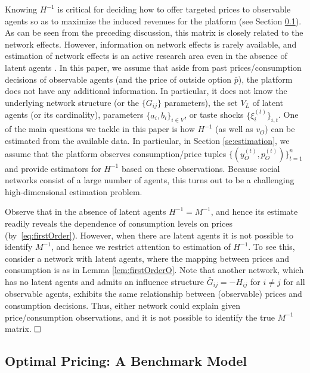 \documentclass[opre,nonblindrev]{informs3} %
\begin{document}
Knowing  $H^{-1}$ is critical
for deciding how to offer targeted prices to observable agents so as to maximize the induced revenues for the platform (see Section \ref{subse:pricing}).
As can be seen from the preceding discussion, this matrix is closely related to the network effects.
However,
information on
network effects
is rarely available, and estimation of network effects is an active research area even in the absence of latent agents 
\citep[see, e.g.,][]{bramoulle2009identification,calvo2009peer,manresa2013estimating}.
In this paper,
we assume that
aside from past prices/consumption decisions of observable agents (and the price of outside option $\bar p$),
the platform does not have any additional information. In particular, it does not know the underlying network structure (or the $\{G_{ij}\}$ parameters), the set $V_L$ of latent agents (or its cardinality),  parameters $\{a_i,b_i\}_{i\in V}$, or taste shocks $\{\xi_i^{(t)}\}_{i,t}$.
One of the main questions we tackle in this paper is how $H^{-1}$  (as well as   ${v}_O$) can be estimated from the available data.
In particular, in Section \ref{se:estimation},
we assume that the platform observes consumption/price tuples $\{({y}_O^{(t)},{p}_O^{(t)})\}_{t=1}^n$
and provide estimators for   $H^{-1}$ based on these observations.
Because social networks consist of a large number of agents, this turns out to be a challenging high-dimensional estimation problem.


\begin{remark}
Observe that in the absence of latent agents $H^{-1}=M^{-1}$, and hence its estimate readily reveals  the dependence of consumption levels on prices (by~\eqref{eq:firstOrder}).
However, when there are latent agents
it is not possible to identify   $M^{-1}$, and hence we restrict attention to estimation of $H^{-1}$.
To see this,
consider a network with latent agents, where
the mapping between prices and consumption is as in Lemma \ref{lem:firstOrderO}.
Note that
another network, which has no latent agents and admits an
influence structure $\bar{G}_{ij}=-H_{ij}$ for $i\neq j$ for all observable agents,
exhibits the same relationship between (observable) prices and consumption decisions.
Thus, either network could explain given price/consumption observations, and it is not possible to identify the true $M^{-1}$ matrix. $\hfill\square$
\end{remark}
 

\subsection{Optimal Pricing: A Benchmark Model} \label{subse:pricing}
\end{document}
